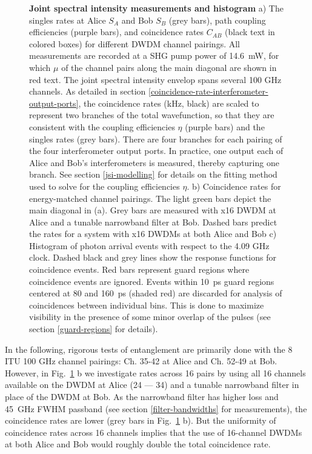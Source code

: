 \documentclass[11pt]{caltech_thesis} %
\begin{document}
{\begin{figure}
\caption[{Joint spectral intensity measurements and histogram}]{\textbf{Joint spectral intensity measurements and histogram} a) The singles rates at Alice $S_A$ and Bob $S_B$ (grey bars), path coupling efficiencies (purple bars), and coincidence rates $C_{AB}$ (black text in colored boxes) for different DWDM channel pairings. All measurements are recorded at a SHG pump power of 14.6~mW, for which $\mu$ of the channel pairs along the main diagonal are shown in red text. The joint spectral intensity envelop spans several 100 GHz channels. As detailed in section \ref{coincidence-rate-interferometer-output-ports}, the coincidence rates (kHz, black) are scaled to represent two branches of the total wavefunction, so that they are consistent with the coupling efficiencies $\eta$ (purple bars) and the singles rates (grey bars). There are four branches for each pairing of the four interferometer output ports. In practice, one output each of Alice and Bob's interferometers is measured, thereby capturing one branch. See section \ref{jsi-modelling} for details on the fitting method used to solve for the coupling efficiencies $\eta$. b) Coincidence rates for energy-matched channel pairings. The light green bars depict the main diagonal in (a). Grey bars are measured with x16 DWDM at Alice and a tunable narrowband filter at Bob. Dashed bars predict the rates for a system with x16 DWDMs at both Alice and Bob c) Histogram of photon arrival events with respect to the 4.09 GHz clock. Dashed black and grey lines show the response functions for coincidence events. Red bars represent guard regions where coincidence events are ignored. Events within 10~ps guard regions centered at 80 and 160~ps (shaded red) are discarded for analysis of coincidences between individual bins. This is done to maximize visibility in the presence of some minor overlap of the pulses (see section \ref{guard-regions} for details).}
\label{fig:figure_2nd_1}
\end{figure}
}

In the following, rigorous tests of entanglement are primarily done with the 8 ITU 100 GHz channel pairings: Ch. 35-42 at Alice and Ch. 52-49 at Bob. However, in Fig.~\ref{fig:figure_2nd_1} b we investigate rates across 16 pairs by using all 16 channels available on the DWDM at Alice (24 --- 34) and a tunable narrowband filter in place of the DWDM at Bob. As the narrowband filter has higher loss and 45~GHz FWHM passband (see section \ref{filter-bandwidths} for measurements), the coincidence rates are lower (grey bars in Fig.~\ref{fig:figure_2nd_1} b). But the uniformity of coincidence rates across 16 channels implies that the use of 16-channel DWDMs at both Alice and Bob would roughly double the total coincidence rate.
\end{document}
